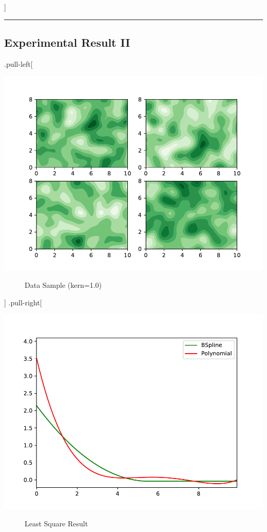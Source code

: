 \documentclass[
]{article}
\begin{document}
{]}

\begin{center}\rule{0.5\linewidth}{0.5pt}\end{center}

\subsection{Experimental Result II}\label{experimental-result-ii}

.pull-left{[}

\begin{description}
\item[\includegraphics{ellipsoid.files/iso100.pdf}]
Data Sample (kern=1.0)
\end{description}

{]} .pull-right{[}

\begin{description}
\item[\includegraphics{ellipsoid.files/result100.pdf}]
Least Square Result
\end{description}
\end{document}
